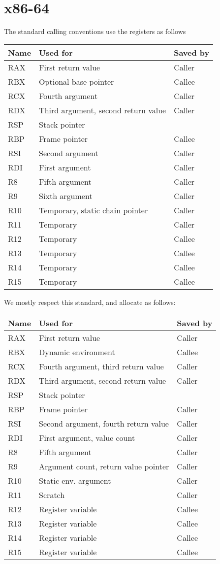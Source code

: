 \chapter{x86-64}
\label{chapter-backend-x86-64}

The standard calling conventions use the registers as follows

\begin{tabular}{|l|l|l|}
\hline
Name & Used for & Saved by\\
\hline
\hline
RAX & First return value & Caller\\
RBX & Optional base pointer & Callee\\
RCX & Fourth argument & Caller \\
RDX & Third argument, second return value & Caller\\
RSP & Stack pointer &\\
RBP & Frame pointer & Callee\\
RSI & Second argument & Caller\\
RDI & First argument & Caller\\
R8 & Fifth argument & Caller\\
R9 & Sixth argument & Caller\\
R10 & Temporary, static chain pointer & Caller\\
R11 & Temporary & Caller\\
R12 & Temporary & Callee\\
R13 & Temporary & Callee\\
R14 & Temporary & Callee\\
R15 & Temporary & Callee\\
\hline
\end{tabular}

We mostly respect this standard, and allocate as follows:

\begin{tabular}{|l|l|l|}
\hline
Name & Used for & Saved by\\
\hline
\hline
RAX & First return value & Caller\\
RBX & Dynamic environment & Callee\\
RCX & Fourth argument, third return value & Caller \\
RDX & Third argument, second return value & Caller\\
RSP & Stack pointer &\\
RBP & Frame pointer & Caller\\
RSI & Second argument, fourth return value & Caller\\
RDI & First argument, value count & Caller\\
R8  & Fifth argument & Caller\\
R9  &  Argument count, return value pointer& Caller\\
R10 & Static env. argument & Caller\\
R11 & Scratch & Caller\\
R12 & Register variable & Callee\\
R13 & Register variable & Callee\\
R14 & Register variable & Callee\\
R15 & Register variable & Callee\\
\hline
\end{tabular}

